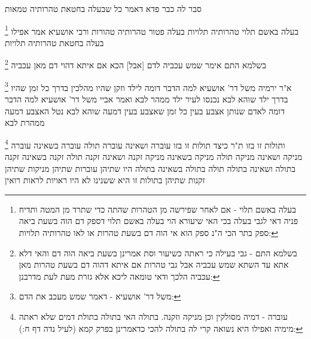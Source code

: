 \documentclass[12pt, openany]{book}
\newcommand{\footnotecomment}[1]{
	\renewcommand\thefootnote{}
	\footnote{#1}}
\newcommand{\commenta}[1]{\footnotecomment{#1}}
\begin{document}
{סבר לה כבר פדא דאמר כל שבעלה בחטאת טהרותיה טמאות
\commenta{בעלה באשם תלוי - אם לאחר שפירשה מן הטהרות שהתה כדי שתרד מן המטה ותדיח פניה דאי לגבי בעלה בכי האי שיעורא הוי בעלה באשם תלוי דספק דם הוה בשעת ביאה ספק בתר הכי ה"נ ספק הוא אי הוה דם בשעת טהרות או לאו טהרותיה תלויות:}
בעלה באשם תלוי טהרותיה תלויות בעלה פטור טהרותיה טהורות 
ורבי אושעיא אמר אפילו בעלה בחטאת טהרותיה תלויות 
\commenta{בשלמא התם - גבי בעילה כי ראתה כשיעור וסת אמרינן בשעת ביאה הוה דם והאי דלא אתא עד השתא שמש עכביה אבל גבי טהרות אם איתא דהוה דם בשעת טהרות מאן עכביה הלכך ודאי טומאה ליכא אלא גזרת מעת לעת מדרבנן:}
בשלמא התם אימר שמש עכביה לדם [אבל] הכא אם איתא דהוי דם מאן עכביה 
\commenta{משל דר' אושעיא - דאמר שמש מעכב את הדם:}
א"ר ירמיה משל דר' אושעיא למה הדבר דומה לילד וזקן שהיו מהלכין בדרך כל זמן שהיו בדרך ילד שוהא לבא נכנסו לעיר ילד ממהר לבא ואמר אביי משל דר' אושעיא למה הדבר דומה לאדם שנותן אצבע בעין כל זמן שאצבע בעין דמעה שוהא לבא נטל האצבע דמעה ממהרת לבא
\commenta{עוברה - דמיה מסולקין וכן מניקה וזקנה. בתולה האי בתולה בתולת דמים שלא ראתה מימיה ואפילו היא נשואה קרי לה בתולה להכי כדאמרינן בפרק קמא (לעיל נדה דף ח:):}
ותולות זו בזו ת"ר כיצד תולות זו בזו עוברה ושאינה עוברה תולה עוברה בשאינה עוברה
מניקה ושאינה מניקה תולה מניקה בשאינה מניקה זקנה ושאינה זקנה תולה זקנה בשאינה זקנה בתולה ושאינה בתולה תולה בתולה בשאינה בתולה 
היו שתיהן עוברות שתיהן מניקות שתיהן זקנות שתיהן בתולות זו היא ששנינו לא היו ראויות לראות רואין
\clearpage}
\end{document}
